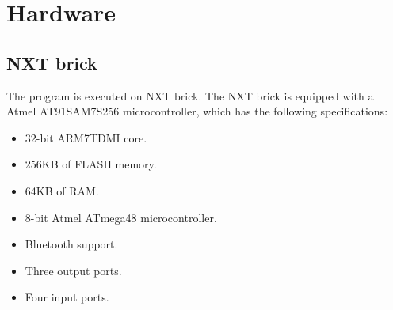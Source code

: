 \section{Hardware}

\subsection{NXT brick}
The program is executed on NXT brick. The NXT brick is equipped with a Atmel AT91SAM7S256 microcontroller, which has the following specifications:
\begin{itemize}
  \item 32-bit ARM7TDMI core.
  \item 256KB of FLASH memory.
  \item 64KB of RAM.
  \item 8-bit Atmel ATmega48 microcontroller.
  \item Bluetooth support.
  \item Three output ports.
  \item Four input ports.
\end{itemize}